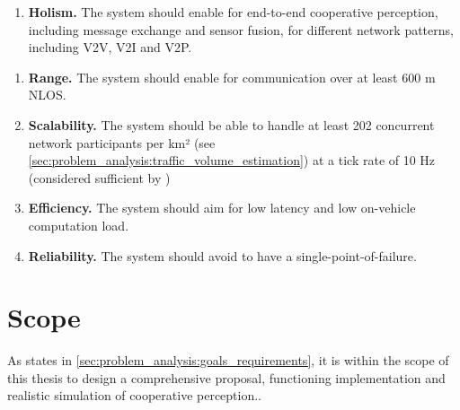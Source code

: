 \begin{enumerate}[F-C1:\ \ ]
	\item \textbf{Holism.} The system should enable for end-to-end cooperative perception, including message exchange and sensor fusion, for different network patterns, including V2V, V2I and V2P.
	\end{enumerate}
\begin{enumerate}[NF-C1:]
	\item \textbf{Range.} The system should enable for communication over at least 600 m NLOS.
	\item \textbf{Scalability.} The system should be able to handle at least 202 concurrent network participants per km² (see \cref{sec:problem_analysis:traffic_volume_estimation}) at a tick rate of 10 Hz (considered sufficient by \cite{Rauch2011, Thandavarayan2019})
	\item \textbf{Efficiency.} The system should aim for low latency and low on-vehicle computation load.
	\item \textbf{Reliability.} The system should avoid to have a single-point-of-failure. 
\end{enumerate}

\section{Scope}
\label{sec:problem_analysis:scope}
As states in \cref{sec:problem_analysis:goals_requirements}, it is within the scope of this thesis to design a comprehensive proposal, functioning implementation and realistic simulation of cooperative perception..

